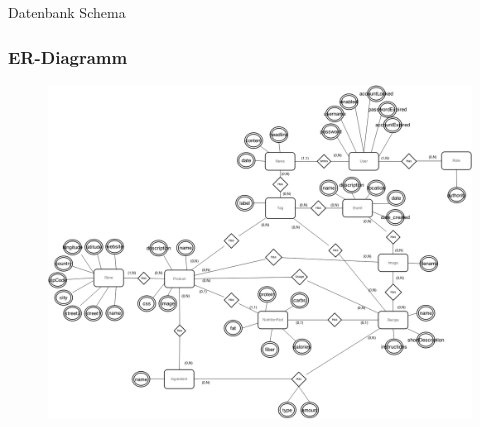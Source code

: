 \begin{frame}
	\begin{center}
		\huge{Datenbank Schema}
	\end{center}
\end{frame}

\begin{frame}
	\frametitle{ER-Diagramm}
	\begin{figure}
	\includegraphics[scale=0.2]{bilder/er-diagramm.png}
	\end{figure}
\end{frame}